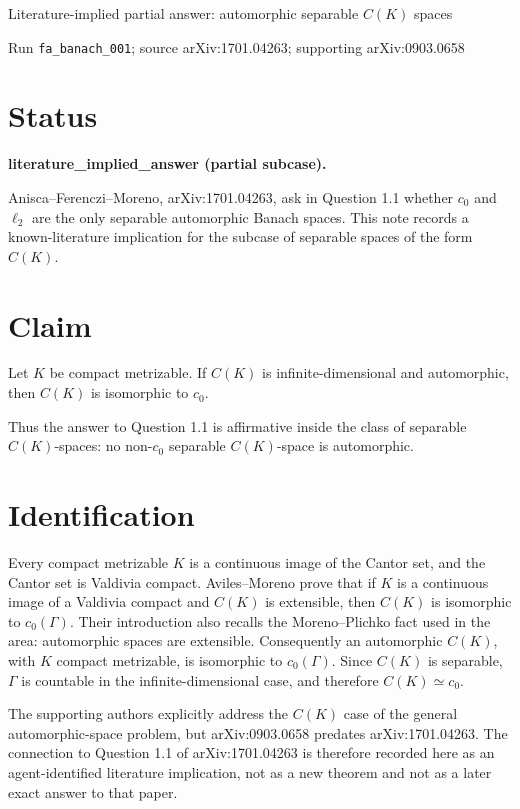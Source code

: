\documentclass[11pt]{article}
\newcommand{\cK}{C(K)}
\newcommand{\cczero}{c_0}
\newcommand{\elltwo}{\ell_2}
\begin{document}
\begin{center}
{\Large Literature-implied partial answer: automorphic separable \(C(K)\) spaces}

\medskip
{\small Run \texttt{fa\_banach\_001}; source arXiv:1701.04263; supporting arXiv:0903.0658}
\end{center}

\section*{Status}

\textbf{literature\_implied\_answer (partial subcase).}

Anisca--Ferenczi--Moreno, arXiv:1701.04263, ask in Question 1.1 whether
\(\cczero\) and \(\elltwo\) are the only separable automorphic Banach spaces.
This note records a known-literature implication for the subcase of separable
spaces of the form \(\cK\).

\section*{Claim}

Let \(K\) be compact metrizable. If \(\cK\) is infinite-dimensional and
automorphic, then \(\cK\) is isomorphic to \(\cczero\).

Thus the answer to Question 1.1 is affirmative inside the class of separable
\(C(K)\)-spaces: no non-\(\cczero\) separable \(C(K)\)-space is automorphic.

\section*{Identification}

Every compact metrizable \(K\) is a continuous image of the Cantor set, and
the Cantor set is Valdivia compact. Aviles--Moreno prove that if \(K\) is a
continuous image of a Valdivia compact and \(C(K)\) is extensible, then
\(C(K)\) is isomorphic to \(\cczero(\Gamma)\). Their introduction also recalls
the Moreno--Plichko fact used in the area: automorphic spaces are extensible.
Consequently an automorphic \(C(K)\), with \(K\) compact metrizable, is
isomorphic to \(\cczero(\Gamma)\). Since \(C(K)\) is separable, \(\Gamma\) is
countable in the infinite-dimensional case, and therefore
\(C(K)\simeq \cczero\).

The supporting authors explicitly address the \(C(K)\) case of the general
automorphic-space problem, but arXiv:0903.0658 predates arXiv:1701.04263.
The connection to Question 1.1 of arXiv:1701.04263 is therefore recorded here
as an agent-identified literature implication, not as a new theorem and not as
a later exact answer to that paper.
\end{document}
